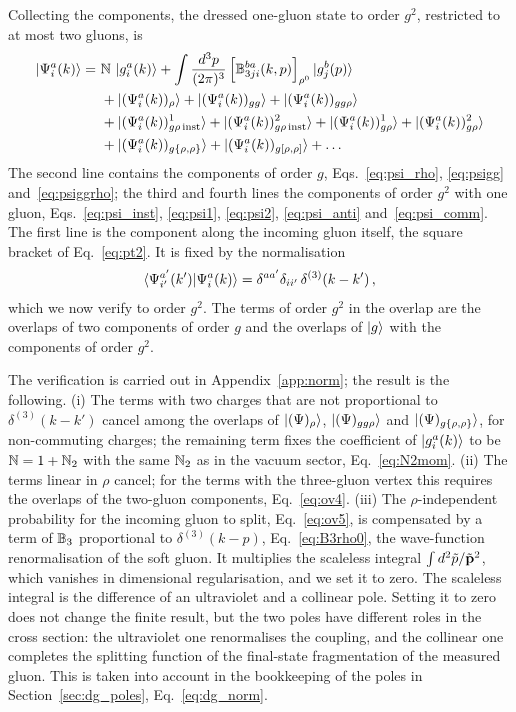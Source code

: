 Collecting the components, the dressed one-gluon state to order $g^2$, restricted to at most two gluons, is
\begin{align}\label{eq:psi_sum}
\ket{\Psi^a_i(k)}=\ &\mathbb{N}\,\ket{g^a_i(k)}+\int\frac{d^3p}{(2\pi)^3}\,\Big[\mathbb{B}^{ba}_{3ji}(k,p)\Big]_{\rho^0}\ket{g^b_j(p)}\notag\\
&+\ket{(\Psi^a_i(k))_\rho}+\ket{(\Psi^a_i(k))_{gg}}+\ket{(\Psi^a_i(k))_{gg\rho}}\notag\\
&+\ket{(\Psi^a_i(k))^1_{g\rho\,{\rm inst}}}+\ket{(\Psi^a_i(k))^2_{g\rho\,{\rm inst}}}+\ket{(\Psi^a_i(k))^1_{g\rho}}+\ket{(\Psi^a_i(k))^2_{g\rho}}\notag\\
&+\ket{(\Psi^a_i(k))_{g\{\rho,\rho\}}}+\ket{(\Psi^a_i(k))_{g[\rho,\rho]}}+\dots
\end{align}
The second line contains the components of order $g$, Eqs.~\eqref{eq:psi_rho}, \eqref{eq:psigg} and~\eqref{eq:psiggrho}; the third and fourth lines the components of order $g^2$ with one gluon, Eqs.~\eqref{eq:psi_inst}, \eqref{eq:psi1}, \eqref{eq:psi2}, \eqref{eq:psi_anti} and~\eqref{eq:psi_comm}. The first line is the component along the incoming gluon itself, the square bracket of Eq.~\eqref{eq:pt2}. It is fixed by the normalisation
\begin{align}\label{eq:normcond}
\braket{\Psi^{a'}_{i'}(k')|\Psi^a_i(k)}=\delta^{aa'}\delta_{ii'}\,\delta^{(3)}(k-k')\,,
\end{align}
which we now verify to order $g^2$. The terms of order $g^2$ in the overlap are the overlaps of two components of order $g$ and the overlaps of $\ket{g}$ with the components of order $g^2$.

The verification is carried out in Appendix~\ref{app:norm}; the result is the following. (i) The terms with two charges that are not proportional to $\delta^{(3)}(k-k')$ cancel among the overlaps of $\ket{(\Psi)_\rho}$, $\ket{(\Psi)_{gg\rho}}$ and $\ket{(\Psi)_{g\{\rho,\rho\}}}$, for non-commuting charges; the remaining term fixes the coefficient of $\ket{g^a_i(k)}$ to be $\mathbb{N}=1+\mathbb{N}_2$ with the same $\mathbb{N}_2$ as in the vacuum sector, Eq.~\eqref{eq:N2mom}. (ii) The terms linear in $\rho$ cancel; for the terms with the three-gluon vertex this requires the overlaps of the two-gluon components, Eq.~\eqref{eq:ov4}. (iii) The $\rho$-independent probability for the incoming gluon to split, Eq.~\eqref{eq:ov5}, is compensated by a term of $\mathbb{B}_3$ proportional to $\delta^{(3)}(k-p)$, Eq.~\eqref{eq:B3rho0}, the wave-function renormalisation of the soft gluon. It multiplies the scaleless integral $\int d^2\tilde p/\tilde{\mathbf{p}}^2$, which vanishes in dimensional regularisation, and we set it to zero. The scaleless integral is the difference of an ultraviolet and a collinear pole. Setting it to zero does not change the finite result, but the two poles have different roles in the cross section: the ultraviolet one renormalises the coupling, and the collinear one completes the splitting function of the final-state fragmentation of the measured gluon. This is taken into account in the bookkeeping of the poles in Section~\ref{sec:dg_poles}, Eq.~\eqref{eq:dg_norm}.

